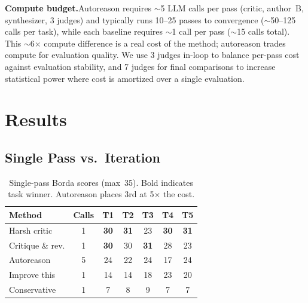 \documentclass[10pt,twocolumn]{article}
\begin{document}
\textbf{Compute budget.}\enspace Autoreason requires ${\sim}$5 LLM calls per pass (critic, author~B, synthesizer, 3 judges) and typically runs 10--25 passes to convergence (${\sim}$50--125 calls per task), while each baseline requires ${\sim}$1 call per pass (${\sim}$15 calls total). This ${\sim}$6$\times$ compute difference is a real cost of the method; autoreason trades compute for evaluation quality. We use 3 judges in-loop to balance per-pass cost against evaluation stability, and 7 judges for final comparisons to increase statistical power where cost is amortized over a single evaluation.

\section{Results}

\subsection{Single Pass vs.\ Iteration}
\label{sec:v1}

\begin{table}[H]
\centering
\small
\begin{tabular}{@{}lcccccc@{}}
\toprule
\textbf{Method} & \textbf{Calls} & \textbf{T1} & \textbf{T2} & \textbf{T3} & \textbf{T4} & \textbf{T5} \\
\midrule
\rowcolor{TableShade}
Harsh critic & 1 & \textbf{30} & \textbf{31} & 23 & \textbf{30} & \textbf{31} \\
Critique \& rev. & 1 & \textbf{30} & 30 & \textbf{31} & 28 & 23 \\
\rowcolor{TableShade}
Autoreason & 5 & 24 & 22 & 24 & 17 & 24 \\
Improve this & 1 & 14 & 14 & 18 & 23 & 20 \\
\rowcolor{TableShade}
Conservative & 1 & 7 & 8 & 9 & 7 & 7 \\
\bottomrule
\end{tabular}
\caption{Single-pass Borda scores (max~35). Bold indicates task winner. Autoreason places 3rd at 5$\times$ the cost.}
\label{tab:v1}
\end{table}
\end{document}
